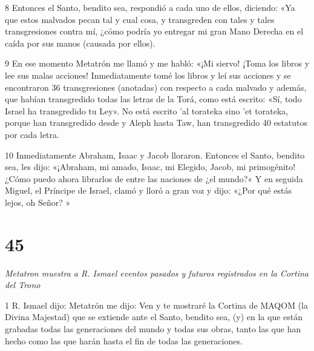 \par 8 Entonces el Santo, bendito sea, respondió a cada uno de ellos, diciendo: «Ya que estos malvados pecan tal y cual cosa, y transgreden con tales y tales transgresiones contra mí, ¿cómo podría yo entregar mi gran Mano Derecha en el caída por sus manos (causada por ellos).

\par 9 En ese momento Metatrón me llamó y me habló: «¡Mi siervo! ¡Toma los libros y lee sus malas acciones! Inmediatamente tomé los libros y leí sus acciones y se encontraron 36 transgresiones (anotadas) con respecto a cada malvado y además, que habían transgredido todas las letras de la Torá, como está escrito: «Sí, todo Israel ha transgredido tu Ley». No está escrito 'al torateka sino 'et torateka, porque han transgredido desde y Aleph hasta Taw, han transgredido 40 estatutos por cada letra.

\par 10 Inmediatamente Abraham, Isaac y Jacob lloraron. Entonces el Santo, bendito sea, les dijo: «¡Abraham, mi amado, Isaac, mi Elegido, Jacob, mi primogénito! ¿Cómo puedo ahora librarlos de entre las naciones de ¿el mundo?« Y en seguida Miguel, el Príncipe de Israel, clamó y lloró a gran voz y dijo: «¿Por qué estás lejos, oh Señor? »


\chapter{45}

\par \textit{Metatron muestra a R. Ismael eventos pasados ​​y futuros registrados en la Cortina del Trono}

\par 1 R. Ismael dijo: Metatrón me dijo: Ven y te mostraré la Cortina de MAQOM (la Divina Majestad) que se extiende ante el Santo, bendito sea, (y) en la que están grabadas todas las generaciones del mundo y todas sus obras, tanto las que han hecho como las que harán hasta el fin de todas las generaciones.

